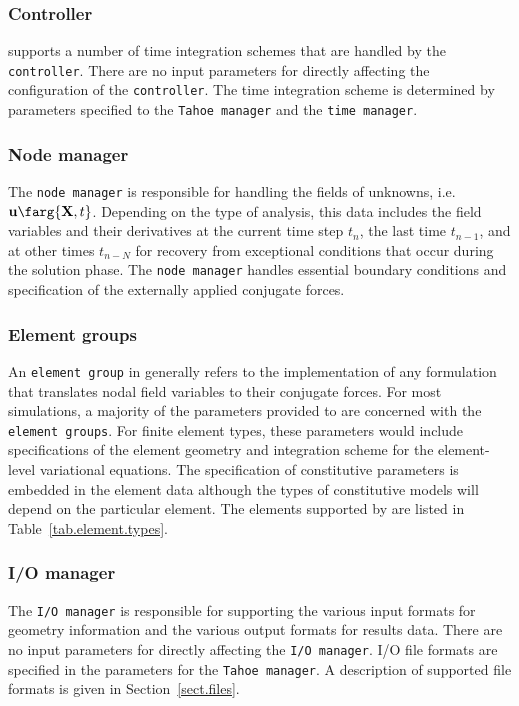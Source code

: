 \subsubsection{Controller}
\tahoe supports a number of time integration schemes that are handled 
by the \texttt{controller}. There are no input parameters for 
directly affecting the configuration of the \texttt{controller}. The 
time integration scheme is determined by parameters specified to the 
\texttt{Tahoe manager} and the \texttt{time manager}.

\subsubsection{Node manager}
The \texttt{node manager} is responsible for handling the fields of 
unknowns, i.e. $\mathbf{u}\farg{\mathbf{X},t}$. Depending on the 
type of analysis, this data includes the field variables and their 
derivatives at the current time step $t_{n}$, the last time 
$t_{n-1}$, and at other times $t_{n-N}$ for recovery from
exceptional conditions that occur during the solution phase.
The \texttt{node manager} handles essential boundary conditions and 
specification of the externally applied conjugate forces.

\subsubsection{Element groups}
An \texttt{element group} in \tahoe generally refers to the 
implementation of any formulation that translates nodal field 
variables to their conjugate forces. For most simulations, a majority 
of the parameters provided to \tahoe are concerned with the 
\texttt{element groups}.  For finite element types, these parameters 
would include specifications of the element geometry and integration 
scheme for the element-level variational equations. The specification 
of constitutive parameters is embedded in the element data although 
the types of constitutive models will depend on the particular element.
The elements supported by \tahoe are listed in Table~\ref{tab.element.types}.

\subsubsection{I/O manager}
The \texttt{I/O manager} is responsible for supporting the various input 
formats for geometry information and the various output formats for 
results data. There are no input parameters for directly affecting the 
\texttt{I/O manager}. I/O file formats are specified in the parameters for the 
\texttt{Tahoe manager}. A description of supported file formats is given in 
Section~\ref{sect.files}.

